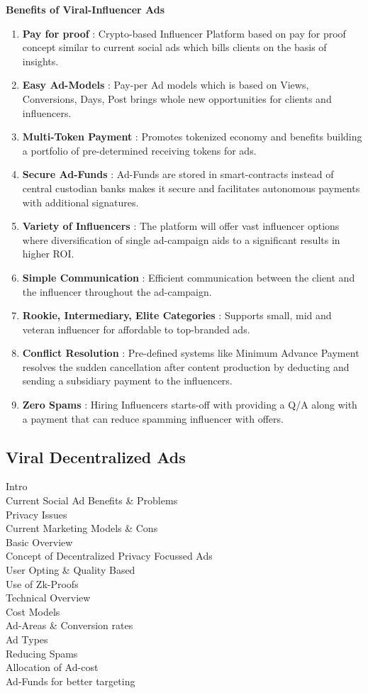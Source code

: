 \documentclass[10pt]{article}
\begin{document}
\textbf{Benefits of Viral-Influencer Ads}
\begin{enumerate}[leftmargin=0.2in]
\item \textbf{Pay for proof} : Crypto-based Influencer Platform based on pay for proof concept similar to current social ads which bills clients on the basis of insights.
\item \textbf{Easy Ad-Models} : Pay-per Ad models which is based on Views, Conversions, Days, Post brings whole new opportunities for clients and influencers.
\item \textbf{Multi-Token Payment} : Promotes tokenized economy and benefits building a portfolio of pre-determined receiving tokens for ads.
\item \textbf{Secure Ad-Funds} : Ad-Funds are stored in smart-contracts instead of central custodian banks makes it secure and facilitates autonomous payments with additional signatures.
\item \textbf{Variety of Influencers} : The platform will offer vast influencer options where diversification of single ad-campaign aids to a significant results in higher ROI.
\item \textbf{Simple Communication} : Efficient communication between the client and the influencer throughout the ad-campaign.
\item \textbf{Rookie, Intermediary, Elite Categories} : Supports small, mid and veteran influencer for affordable to top-branded ads.
\item \textbf{Conflict Resolution} : Pre-defined systems like Minimum Advance Payment resolves the sudden cancellation after content production by deducting and sending a subsidiary payment to the influencers.
\item \textbf{Zero Spams} : Hiring Influencers starts-off with providing a Q/A along with a payment that can reduce spamming influencer with offers.
\end{enumerate}
\newpage
\subsection{Viral Decentralized Ads}

Intro\\
Current Social Ad Benefits \& Problems\\
Privacy Issues\\
Current Marketing Models \& Cons\\
Basic Overview\\
Concept of Decentralized Privacy Focussed Ads\\
User Opting \& Quality Based\\
Use of Zk-Proofs\\
Technical Overview\\
Cost Models\\
Ad-Areas \& Conversion rates\\
Ad Types\\
Reducing Spams\\
Allocation of Ad-cost\\
Ad-Funds for better targeting\\
\end{document}
